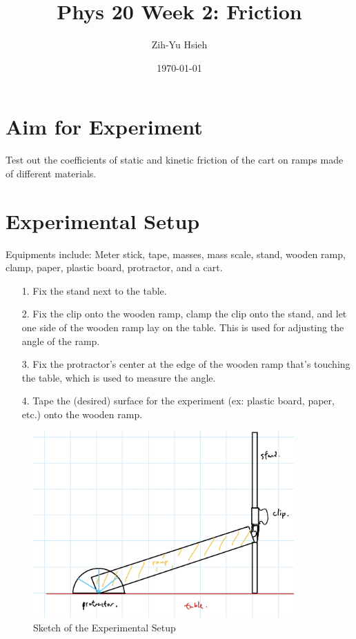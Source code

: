 \documentclass{article}
\title{Phys 20 Week 2: Friction}
\author{Zih-Yu Hsieh}
\date{\today}
\begin{document}
\maketitle

\section{Aim for Experiment}

Test out the coefficients of static and kinetic friction of the cart on ramps made of different materials.

\section{Experimental Setup}
Equipments include: Meter stick, tape, masses, mass scale, stand, wooden ramp, clamp, paper, plastic board, protractor, and a cart.

\begin{itemize}
    \item[1.] Fix the stand next to the table.
    \item[2.] Fix the clip onto the wooden ramp, clamp the clip onto the stand, and let one side of the wooden ramp lay on the table. This is used for adjusting the angle of the ramp.
    \item[3.] Fix the protractor's center at the edge of the wooden ramp that's touching the table, which is used to measure the angle.
    \item[4.] Tape the (desired) surface for the experiment (ex: plastic board, paper, etc.) onto the wooden ramp.
\end{itemize}
\begin{figure}[h!]
    \centering
    \includegraphics[width=100mm]{setup_sketch.jpg}
    \caption{Sketch of the Experimental Setup}
\end{figure}
\end{document}
